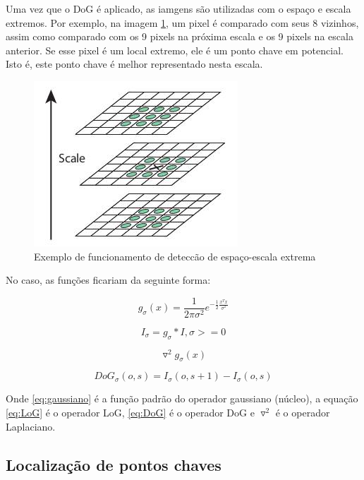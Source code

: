 Uma vez que o DoG é aplicado, as iamgens são utilizadas com o espaço e escala extremos. Por exemplo, na imagem \ref{fig:extrema}, um pixel é comparado com seus 8 vizinhos, assim como comparado com os 9 pixels na próxima escala e os 9 pixels na escala anterior. Se esse pixel é um local extremo, ele é um ponto chave em potencial. Isto é, este ponto chave é melhor representado nesta escala.

\begin{figure} [!h]
	\centering
	\includegraphics[width=0.45\linewidth]{figs/sift_local_extrema.jpg}
	\caption{%
	Exemplo de funcionamento de deteccão de espaço-escala extrema
	}\label{fig:extrema}
\end{figure}

No caso, as funções ficariam da seguinte forma: 

\begin{equation}
\label{eq:gaussiano}
	g_\sigma(x) = \frac{1}{2 \pi \sigma ^2} e^{-\frac{1}{2} \frac{x^T x}{\sigma ^2}}
\end{equation}

\begin{equation}
\label{eq:gaussianScaleSpace}
	I_\sigma = g_\sigma * I, \sigma >= 0
\end{equation}

\begin{equation}
\label{eq:LoG}
	\triangledown^2	g_\sigma(x)
\end{equation}

\begin{equation}
\label{eq:DoG}
	DoG_\sigma(o,s) = I_\sigma(o,s+1) - I_\sigma(o,s)
\end{equation}


Onde \ref{eq:gaussiano} é a função padrão do operador gaussiano (núcleo), a equação \ref{eq:LoG} é o operador LoG,  \ref{eq:DoG} é o operador DoG e $\triangledown^2$ é o operador Laplaciano.

\subsection{Localização de pontos chaves}

